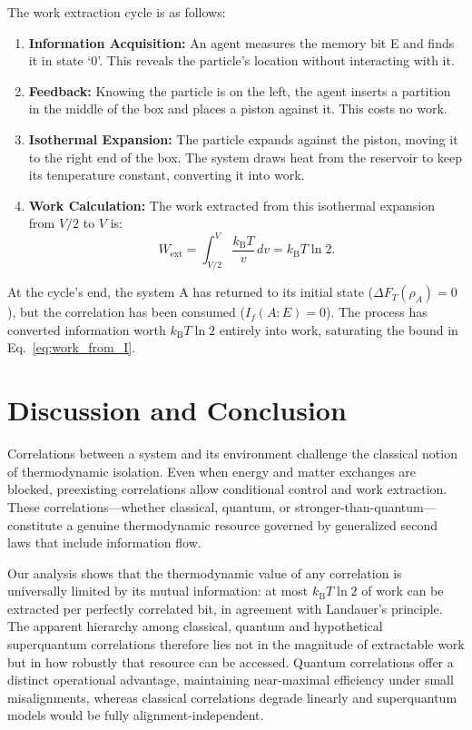 \documentclass[%
  reprint,
  showpacs,
  showkeys,
  pra,
  longbibliography,
  floatfix,
  x11names
]{revtex4-2}
\begin{document}
The work extraction cycle is as follows:
\begin{enumerate}
    \item \textbf{Information Acquisition:} An agent measures the memory bit E and finds it in state `0'. This reveals the particle's location without interacting with it.
    \item \textbf{Feedback:} Knowing the particle is on the left, the agent inserts a partition in the middle of the box and places a piston against it. This costs no work.
    \item \textbf{Isothermal Expansion:} The particle expands against the piston, moving it to the right end of the box. The system draws heat from the reservoir to keep its temperature constant, converting it into work.
    \item \textbf{Work Calculation:} The work extracted from this isothermal expansion from $V/2$ to $V$ is:
    \begin{equation}
        W_{\mathrm{ext}} = \int_{V/2}^{V} \frac{k_{\mathrm{B}}T}{v} \,dv = k_{\mathrm{B}}T \ln 2.
        \label{eq:szilard_work}
    \end{equation}
\end{enumerate}
At the cycle's end, the system A has returned to its initial state ($\Delta F_T(\rho_A) = 0$), but the correlation has been consumed ($I_f(A:E) = 0$). The process has converted information worth $k_{\mathrm{B}}T\ln 2$ entirely into work, saturating the bound in Eq.~\eqref{eq:work_from_I}.

\section{Discussion and Conclusion}

Correlations between a system and its environment challenge the classical notion of thermodynamic isolation. Even when energy and matter exchanges are blocked, preexisting correlations allow conditional control and work extraction. These correlations---whether classical, quantum, or stronger-than-quantum---constitute a genuine thermodynamic resource governed by generalized second laws that include information flow.

Our analysis shows that the thermodynamic value of any correlation is universally limited by its mutual information: at most $k_{\mathrm{B}}T\ln 2$ of work can be extracted per perfectly correlated bit, in agreement with Landauer's principle. The apparent hierarchy among classical, quantum and hypothetical superquantum correlations therefore lies not in the magnitude of extractable work but in how robustly that resource can be accessed. Quantum correlations offer a distinct operational advantage, maintaining near-maximal efficiency under small misalignments, whereas classical correlations degrade linearly and superquantum models would be fully alignment-independent.
\end{document}
